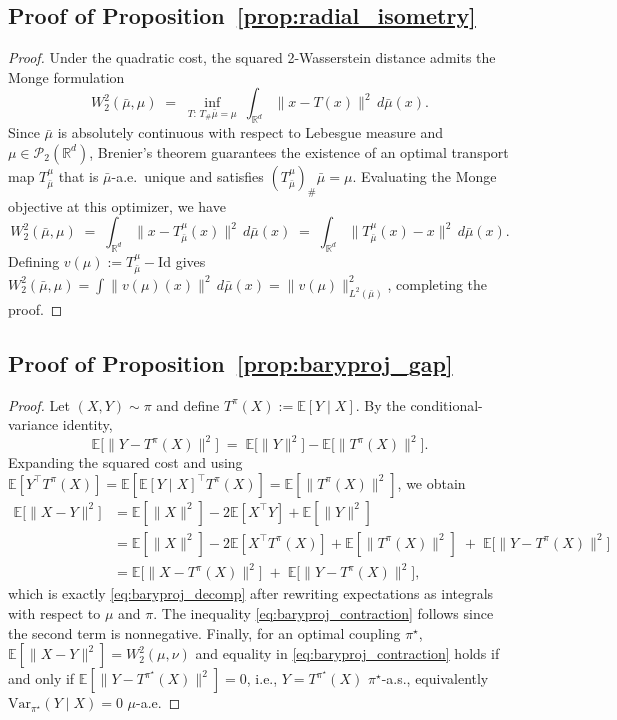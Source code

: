 \documentclass{article}
\theoremstyle{plain}
\theoremstyle{definition}
\theoremstyle{remark}
\begin{document}
\subsection{Proof of Proposition~\ref{prop:radial_isometry}}
\begin{proof}
Under the quadratic cost, the squared 2-Wasserstein distance admits the Monge formulation
\[
W_2^2(\bar{\mu},\mu)
\;=\;
\inf_{T:\,T_{\#}\bar{\mu}=\mu}\ \int_{\mathbb{R}^d}\|x-T(x)\|^2\,d\bar{\mu}(x).
\]
Since $\bar{\mu}$ is absolutely continuous with respect to Lebesgue measure and $\mu\in\mathcal{P}_2(\mathbb{R}^d)$, Brenier's theorem guarantees the
existence of an optimal transport map $T_{\bar{\mu}}^{\mu}$ that is $\bar{\mu}$-a.e.\ unique and satisfies
$(T_{\bar{\mu}}^{\mu})_{\#}\bar{\mu}=\mu$.
Evaluating the Monge objective at this optimizer, we have
$$
W_2^2(\bar{\mu},\mu)
\;=\;
\int_{\mathbb{R}^d}\|x-T_{\bar{\mu}}^{\mu}(x)\|^2\,d\bar{\mu}(x)
\;=\;
\int_{\mathbb{R}^d}\|T_{\bar{\mu}}^{\mu}(x)-x\|^2\,d\bar{\mu}(x).
$$
Defining $v(\mu):=T_{\bar{\mu}}^{\mu}-\mathrm{Id}$ gives
$W_2^2(\bar{\mu},\mu)=\int\|v(\mu)(x)\|^2\,d\bar{\mu}(x)=\|v(\mu)\|_{L^2(\bar{\mu})}^2$, completing the proof.
\end{proof}

\subsection{Proof of Proposition~\ref{prop:baryproj_gap}}
\begin{proof}
Let $(X,Y)\sim\pi$ and define $T^{\pi}(X):=\mathbb E[Y\mid X]$. By the conditional-variance identity,
\[
\mathbb E\big[\|Y-T^{\pi}(X)\|^2\big]
\;=\;
\mathbb E\big[\|Y\|^2\big]-\mathbb E\big[\|T^{\pi}(X)\|^2\big].
\]
Expanding the squared cost and using $\mathbb E[Y^\top T^{\pi}(X)]=\mathbb E[\mathbb E[Y\mid X]^\top T^{\pi}(X)]=\mathbb E[\|T^{\pi}(X)\|^2]$, we obtain
\begin{align*}
\mathbb E\big[\|X-Y\|^2\big]
&=\mathbb E[\|X\|^2]-2\mathbb E[X^\top Y]+\mathbb E[\|Y\|^2]\\
&=\mathbb E[\|X\|^2]-2\mathbb E[X^\top T^{\pi}(X)]+\mathbb E[\|T^{\pi}(X)\|^2]
 \;+\; \mathbb E\big[\|Y-T^{\pi}(X)\|^2\big]\\
&=\mathbb E\big[\|X-T^{\pi}(X)\|^2\big]\;+\;\mathbb E\big[\|Y-T^{\pi}(X)\|^2\big],
\end{align*}
which is exactly \cref{eq:baryproj_decomp} after rewriting expectations as integrals with respect to $\mu$ and $\pi$.
The inequality \cref{eq:baryproj_contraction} follows since the second term is nonnegative.
Finally, for an optimal coupling $\pi^\star$, $\mathbb E[\|X-Y\|^2]=W_2^2(\mu,\nu)$ and equality in \cref{eq:baryproj_contraction} holds if and only if $\mathbb E[\|Y-T^{\pi^\star}(X)\|^2]=0$, i.e., $Y=T^{\pi^\star}(X)$ $\pi^\star$-a.s., equivalently $\mathrm{Var}_{\pi^\star}(Y\mid X)=0$ $\mu$-a.e.
\end{proof}
\end{document}
